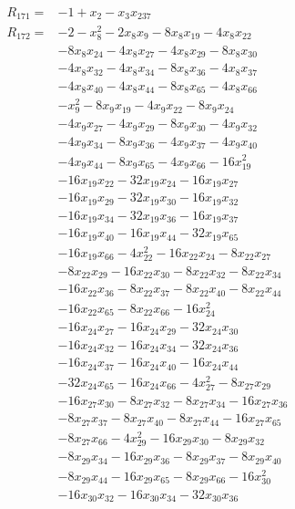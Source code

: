 \begin{align*}
R_{171}={}&-1 +x_{2} -x_{3}x_{237}\\[3pt]
R_{172}={}&-2 -x_{8}^{2} -2x_{8}x_{9} -8x_{8}x_{19} -4x_{8}x_{22}\\
&-8x_{8}x_{24} -4x_{8}x_{27} -4x_{8}x_{29} -8x_{8}x_{30}\\
&-4x_{8}x_{32} -4x_{8}x_{34} -8x_{8}x_{36} -4x_{8}x_{37}\\
&-4x_{8}x_{40} -4x_{8}x_{44} -8x_{8}x_{65} -4x_{8}x_{66}\\
&-x_{9}^{2} -8x_{9}x_{19} -4x_{9}x_{22} -8x_{9}x_{24}\\
&-4x_{9}x_{27} -4x_{9}x_{29} -8x_{9}x_{30} -4x_{9}x_{32}\\
&-4x_{9}x_{34} -8x_{9}x_{36} -4x_{9}x_{37} -4x_{9}x_{40}\\
&-4x_{9}x_{44} -8x_{9}x_{65} -4x_{9}x_{66} -16x_{19}^{2}\\
&-16x_{19}x_{22} -32x_{19}x_{24} -16x_{19}x_{27}\\
&-16x_{19}x_{29} -32x_{19}x_{30} -16x_{19}x_{32}\\
&-16x_{19}x_{34} -32x_{19}x_{36} -16x_{19}x_{37}\\
&-16x_{19}x_{40} -16x_{19}x_{44} -32x_{19}x_{65}\\
&-16x_{19}x_{66} -4x_{22}^{2} -16x_{22}x_{24} -8x_{22}x_{27}\\
&-8x_{22}x_{29} -16x_{22}x_{30} -8x_{22}x_{32} -8x_{22}x_{34}\\
&-16x_{22}x_{36} -8x_{22}x_{37} -8x_{22}x_{40} -8x_{22}x_{44}\\
&-16x_{22}x_{65} -8x_{22}x_{66} -16x_{24}^{2}\\
&-16x_{24}x_{27} -16x_{24}x_{29} -32x_{24}x_{30}\\
&-16x_{24}x_{32} -16x_{24}x_{34} -32x_{24}x_{36}\\
&-16x_{24}x_{37} -16x_{24}x_{40} -16x_{24}x_{44}\\
&-32x_{24}x_{65} -16x_{24}x_{66} -4x_{27}^{2} -8x_{27}x_{29}\\
&-16x_{27}x_{30} -8x_{27}x_{32} -8x_{27}x_{34} -16x_{27}x_{36}\\
&-8x_{27}x_{37} -8x_{27}x_{40} -8x_{27}x_{44} -16x_{27}x_{65}\\
&-8x_{27}x_{66} -4x_{29}^{2} -16x_{29}x_{30} -8x_{29}x_{32}\\
&-8x_{29}x_{34} -16x_{29}x_{36} -8x_{29}x_{37} -8x_{29}x_{40}\\
&-8x_{29}x_{44} -16x_{29}x_{65} -8x_{29}x_{66} -16x_{30}^{2}\\
&-16x_{30}x_{32} -16x_{30}x_{34} -32x_{30}x_{36}\\

\end{align*}
